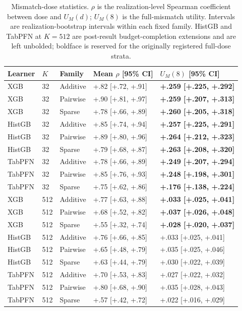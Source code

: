 \begin{table}[H]
\caption{Mismatch-dose statistics. $\rho$ is the realization-level Spearman coefficient between dose and $U_M(d)$; $U_M(8)$ is the full-mismatch utility. Intervals are realization-bootstrap intervals within each fixed family. HistGB and TabPFN at $K=512$ are post-result budget-completion extensions and are left unbolded; boldface is reserved for the originally registered full-dose strata.}
\label{tab:app-measurement-dose-stats}
\label{tab:app_mismatch_stats}
\centering\scriptsize
\setlength{\tabcolsep}{5pt}
\begin{tabular}{lllll}
\toprule
Learner & $K$ & Family & Mean $\rho$ [95\% CI] & $U_M(8)$ [95\% CI] \\
\midrule
XGB & 32 & Additive & +.82 [+.72, +.91] & \textbf{+.259 [+.225, +.292]} \\
XGB & 32 & Pairwise & +.90 [+.81, +.97] & \textbf{+.259 [+.207, +.313]} \\
XGB & 32 & Sparse & +.78 [+.66, +.89] & \textbf{+.260 [+.205, +.318]} \\
HistGB & 32 & Additive & +.85 [+.74, +.94] & \textbf{+.257 [+.225, +.291]} \\
HistGB & 32 & Pairwise & +.89 [+.80, +.96] & \textbf{+.264 [+.212, +.323]} \\
HistGB & 32 & Sparse & +.79 [+.68, +.87] & \textbf{+.263 [+.208, +.320]} \\
TabPFN & 32 & Additive & +.78 [+.66, +.89] & \textbf{+.249 [+.207, +.294]} \\
TabPFN & 32 & Pairwise & +.85 [+.76, +.93] & \textbf{+.248 [+.198, +.301]} \\
TabPFN & 32 & Sparse & +.75 [+.62, +.86] & \textbf{+.176 [+.138, +.224]} \\
\addlinespace[1pt]
XGB & 512 & Additive & +.77 [+.63, +.88] & \textbf{+.033 [+.025, +.041]} \\
XGB & 512 & Pairwise & +.68 [+.52, +.82] & \textbf{+.037 [+.026, +.048]} \\
XGB & 512 & Sparse & +.55 [+.32, +.74] & \textbf{+.028 [+.020, +.037]} \\
HistGB & 512 & Additive & +.76 [+.66, +.85] & +.033 [+.025, +.041] \\
HistGB & 512 & Pairwise & +.65 [+.48, +.79] & +.035 [+.025, +.046] \\
HistGB & 512 & Sparse & +.63 [+.44, +.79] & +.030 [+.022, +.039] \\
TabPFN & 512 & Additive & +.70 [+.53, +.83] & +.027 [+.022, +.032] \\
TabPFN & 512 & Pairwise & +.80 [+.68, +.90] & +.035 [+.028, +.043] \\
TabPFN & 512 & Sparse & +.57 [+.42, +.72] & +.022 [+.016, +.029] \\
\bottomrule
\end{tabular}
\end{table}
